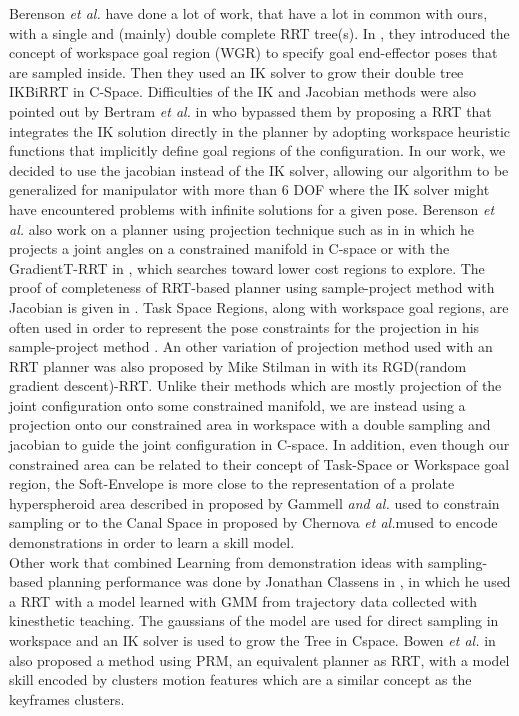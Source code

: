 \documentclass[letterpaper, 10 pt, conference]{ieeeconf}  %
\begin{document}
 Berenson \textit{et al.} have done a lot of work, that have a lot in common with ours, with a single and (mainly) double complete RRT tree(s). In \cite{Berenson_WGR}, they introduced the concept of workspace goal region (WGR) to
specify goal end-effector poses that are sampled inside. Then they used an IK solver to grow their double tree IKBiRRT in C-Space.
 Difficulties of the IK and Jacobian methods were also pointed out by Bertram \textit{et al.} in \cite{Bertram_2006_5436} who bypassed them by proposing a RRT that integrates the IK solution directly in the planner by adopting workspace heuristic functions that implicitly define goal regions of the configuration.
In our work, we decided to use the jacobian instead of the IK solver, allowing our algorithm to be generalized for manipulator with more than 6 DOF where the IK solver might have  encountered problems with infinite solutions for a given pose.
Berenson \textit{et al.} also work on a planner using projection technique such as in \cite{Berenson_ConstraintManifold} in which he projects a joint angles on a constrained manifold in C-space or with the  GradientT-RRT in \cite{Berenson_Gradient}, which searches toward lower cost regions to explore. The proof of completeness of RRT-based planner using sample-project method with Jacobian is given in \cite{Berenson_2010_6558}. Task Space Regions, along with workspace goal regions, are often used in order to represent the pose constraints for the projection in his sample-project method \cite{BerensonTSR}. An other variation of projection method used with an RRT planner was also proposed by  Mike Stilman in \cite{RGD_RRT} with its RGD(random gradient descent)-RRT. Unlike their methods which are mostly projection of the joint configuration onto some constrained manifold,  we are instead using a projection onto our constrained area in workspace with a double sampling and jacobian to guide the joint configuration in C-space.
In addition, even though our constrained area can be related to their concept of Task-Space or Workspace goal region, the Soft-Envelope is more close to the representation of a prolate hyperspheroid area described in \cite{informedRRTStar} proposed by Gammell \textit{and al.} used to constrain sampling or to the Canal Space in \cite{CanalSpace} proposed by Chernova \textit{et al.}mused to encode demonstrations in order to learn a skill model.\\
Other work that combined Learning from demonstration ideas with sampling-based planning performance was done by Jonathan Classens in  \cite{RRTandLFD}, in which he used a RRT with a model learned with GMM from trajectory data collected with kinesthetic teaching. The gaussians of the model are used for direct sampling in workspace and an IK solver is used to grow the Tree in Cspace. Bowen \textit{et al.} in \cite{ModelAndPRM} also proposed a method using PRM, an equivalent planner as RRT, with a model skill encoded by clusters motion features which are a similar concept as the keyframes clusters.\\
\end{document}
